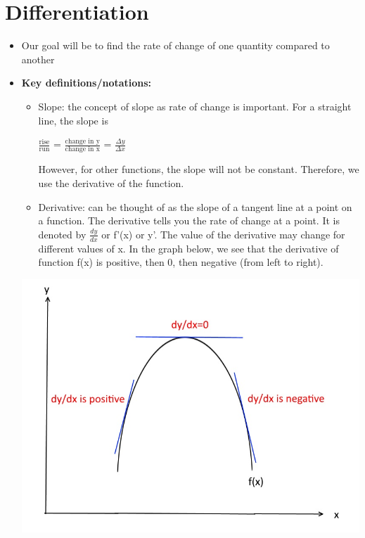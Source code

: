 \documentclass[11pt]{article}
\theoremstyle{definition}
\theoremstyle{remark}
\begin{document}
\section{Differentiation}
\begin{itemize}
\item Our goal will be to find the rate of change of one quantity compared to another
\item \textbf{Key definitions/notations:} 
\begin{itemize}
\item Slope: the concept of slope as rate of change is important. For a straight line, the slope is \begin{center} {\LARGE $\frac{\text{rise}}{\text{run}} $} = {\LARGE $\frac{\text{change in y}}{\text{change in x}} $} = {\LARGE
$\frac{\Delta{y}}{\Delta{x}}$ }\end{center}
However, for other functions, the slope will not be constant. Therefore, we use the derivative of the function.
\item Derivative: can be thought of as the slope of a tangent line at a point on a function. The derivative tells you the rate of change at a point. It is denoted by {\LARGE $ \frac{\textit{dy}}{\textit{dx}}$} or f'(x) or y'. The value of the derivative may change for different values of x. In the graph below, we see that the derivative of function f(x) is positive, then 0, then negative (from left to right). 

\end{itemize}
\begin{center}
\includegraphics[scale=0.5]{img/calculus_differential1.jpg}\\
\end{center}


\end{itemize}
\end{document}
